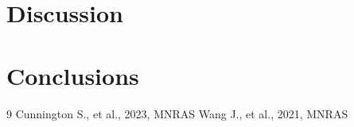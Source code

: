 \documentclass[a4paper,fleqn,usenatbib]{mnras}
\begin{document}
\section{Discussion}

\section{Conclusions}

\begin{thebibliography}{9}
Cunnington S., et al., 2023, MNRAS %
Wang J., et al., 2021, MNRAS %
\end{thebibliography}
\end{document}
